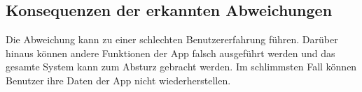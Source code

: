 \documentclass{article}
\begin{document}
\subsection{Konsequenzen der erkannten Abweichungen}
	Die Abweichung kann zu einer schlechten Benutzererfahrung führen. Darüber hinaus können andere Funktionen der App falsch ausgeführt werden und das gesamte System kann zum Absturz gebracht werden. Im schlimmsten Fall können Benutzer ihre Daten der App nicht wiederherstellen. \par
\end{document}
